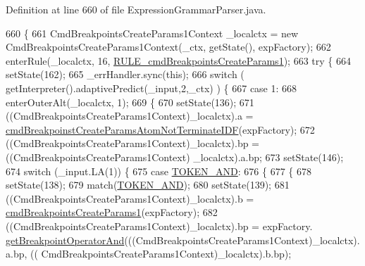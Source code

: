 Definition at line 660 of file Expression\+Grammar\+Parser.\+java.


\begin{DoxyCode}
660                                                                                                            
                                   \{
661     CmdBreakpointsCreateParams1Context \_localctx = \textcolor{keyword}{new} CmdBreakpointsCreateParams1Context(\_ctx, getState(),
       expFactory);
662     enterRule(\_localctx, 16, \hyperlink{classgov_1_1nasa_1_1jpf_1_1inspector_1_1server_1_1expression_1_1parser_1_1_expression_grammar_parser_a8abd39c2443d83b9bbcfa16eedc0f01f}{RULE\_cmdBreakpointsCreateParams1});
663     \textcolor{keywordflow}{try} \{
664       setState(162);
665       \_errHandler.sync(\textcolor{keyword}{this});
666       \textcolor{keywordflow}{switch} ( getInterpreter().adaptivePredict(\_input,2,\_ctx) ) \{
667       \textcolor{keywordflow}{case} 1:
668         enterOuterAlt(\_localctx, 1);
669         \{
670         setState(136);
671         ((CmdBreakpointsCreateParams1Context)\_localctx).a = 
      \hyperlink{classgov_1_1nasa_1_1jpf_1_1inspector_1_1server_1_1expression_1_1parser_1_1_expression_grammar_parser_a877ec76515f792b811174f247de762a6}{cmdBreakpoinstCreateParamsAtomNotTerminateIDF}(expFactory);
672         ((CmdBreakpointsCreateParams1Context)\_localctx).bp =  ((CmdBreakpointsCreateParams1Context)
      \_localctx).a.bp; 
673         setState(146);
674         \textcolor{keywordflow}{switch} (\_input.LA(1)) \{
675         \textcolor{keywordflow}{case} \hyperlink{classgov_1_1nasa_1_1jpf_1_1inspector_1_1server_1_1expression_1_1parser_1_1_expression_grammar_parser_a331667ae98e64b4bcdd3b866e7e2cd64}{TOKEN\_AND}:
676           \{
677           \{
678           setState(138);
679           match(\hyperlink{classgov_1_1nasa_1_1jpf_1_1inspector_1_1server_1_1expression_1_1parser_1_1_expression_grammar_parser_a331667ae98e64b4bcdd3b866e7e2cd64}{TOKEN\_AND});
680           setState(139);
681           ((CmdBreakpointsCreateParams1Context)\_localctx).b = 
      \hyperlink{classgov_1_1nasa_1_1jpf_1_1inspector_1_1server_1_1expression_1_1parser_1_1_expression_grammar_parser_aa16584e37b631f4c0cdd1b148deda9df}{cmdBreakpointsCreateParams1}(expFactory);
682            ((CmdBreakpointsCreateParams1Context)\_localctx).bp =  expFactory.
      \hyperlink{classgov_1_1nasa_1_1jpf_1_1inspector_1_1server_1_1expression_1_1_expression_factory_ad31f78a1f8d431686f1efdea0ede572b}{getBreakpointOperatorAnd}(((CmdBreakpointsCreateParams1Context)\_localctx).a.bp, ((
      CmdBreakpointsCreateParams1Context)\_localctx).b.bp); 

\end{DoxyCode}
